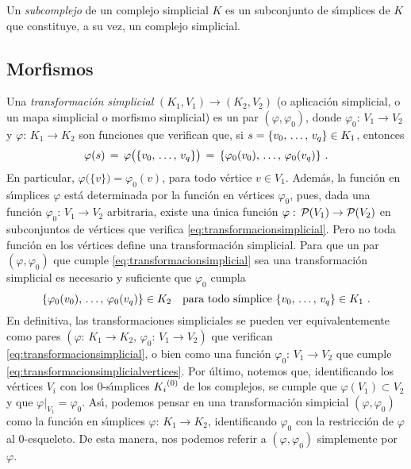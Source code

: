 Un \emph{subcomplejo} de un complejo simplicial $K$ es un subconjunto de
s\'{\i}mplices de $K$ que constituye, a su vez, un complejo simplicial.

\subsection{Morfismos}
Una \emph{transformaci\'{o}n simplicial}
$(K_{1},V_{1})\rightarrow (K_{2},V_{2})$ (o aplicaci\'{o}n simplicial, o un
mapa simplicial o morfismo simplicial) es un par $(\varphi,\varphi_{0})$,
donde $\varphi_{0}:\,V_{1}\rightarrow V_{2}$ y
$\varphi:\,K_{1}\rightarrow K_{2}$ son funciones que verifican que, si
$s=\{\lista[0]{v}{q}\}\in K_{1}$, entonces
\begin{equation}
	\label{eq:transformacionsimplicial}
	\varphi(s) \,=\, \varphi\big(\{\lista[0]{v}{q}\}\big) \,=\,
		\{\varphi_{0}(v_{0}),\,\dots,\,\varphi_{0}(v_{q})\}
	\text{ .}
\end{equation}
%
En particular, $\varphi\big(\{v\}\big)=\varphi_{0}(v)$, para todo v\'{e}rtice
$v\in V_{1}$. Adem\'{a}s, la funci\'{o}n en s\'{\i}mplices $\varphi$ est\'{a}
determinada por la funci\'{o}n en v\'{e}rtices $\varphi_{0}$, pues, dada
una funci\'{o}n $\varphi_{0}:\,V_{1}\rightarrow V_{2}$ arbitraria, existe
una \'{u}nica funci\'{o}n $\varphi:\,\partes(V_{1})\rightarrow\partes(V_{2})$
en subconjuntos de v\'{e}rtices que verifica
\eqref{eq:transformacionsimplicial}. Pero no toda funci\'{o}n en los
v\'{e}rtices define una transformaci\'{o}n simplicial. Para que un
par $(\varphi,\varphi_{0})$ que cumple \eqref{eq:transformacionsimplicial}
sea una transformaci\'{o}n simplicial es necesario y suficiente que
$\varphi_{0}$ cumpla
\begin{equation}
	\label{eq:transformacionsimplicialvertices}
	\{\varphi_{0}(v_{0}),\,\dots,\,\varphi_{0}(v_{q})\}\in K_{2}
		\quad\text{para todo s\'{\i}mplice }
		\{\lista[0]{v}{q}\}\in K_{1}
	\text{ .}
\end{equation}
%
En definitiva, las transformaciones simpliciales se pueden ver
equivalentemente como pares
\begin{math}
	(\varphi:\,K_{1}\rightarrow K_{2},\,
		\varphi_{0}:\,V_{1}\rightarrow V_{2})
\end{math}
que verifican \eqref{eq:transformacionsimplicial}, o bien como una
funci\'{o}n $\varphi_{0}:\,V_{1}\rightarrow V_{2}$ que cumple
\eqref{eq:transformacionsimplicialvertices}. Por \'{u}ltimo, notemos que,
identificando los v\'{e}rtices $V_{i}$ con los $0$-s\'{\i}mplices
$\qesq{0}{K_{i}}$ de los complejos, se cumple que $\varphi(V_{1})\subset V_{2}$
y que $\varphi|_{V_{1}}=\varphi_{0}$. As\'{\i}, podemos pensar en una
transformaci\'{o}n simpicial $(\varphi,\varphi_{0})$ como la funci\'{o}n en
s\'{\i}mplices $\varphi:\,K_{1}\rightarrow K_{2}$, identificando $\varphi_{0}$
con la restricci\'{o}n de $\varphi$ al $0$-esqueleto. De esta manera, nos
podemos referir a $(\varphi,\varphi_{0})$ simplemente por $\varphi$.

